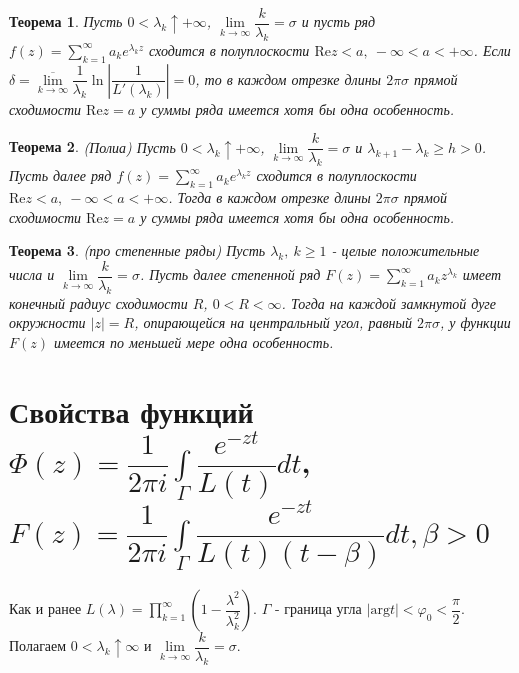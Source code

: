 \documentclass[9pt]{article}
\newtheorem{theorem}{Теорема} %
\begin{document}
				\begin{theorem}
					Пусть  $0 < \lambda_k \uparrow + \infty$,  $\lim\limits_{k\to\infty} \dfrac{k}{\lambda_k} = \sigma$ и пусть ряд $f(z) = \sum\limits_{k=1}^{\infty} a_k e^{\lambda_k z}$ сходится в полуплоскости $\mathrm{Re} z < a, \ -\infty < a < + \infty$. Если $\delta  = \overline{\lim\limits_{k\to\infty}} \dfrac{1}{\lambda_k} \ln{|\dfrac{1}{L'(\lambda_k)}|} = 0$, то в каждом отрезке длины $2\pi \sigma$ прямой сходимости $\mathrm{Re} z = a$ у суммы ряда имеется хотя бы одна особенность.
				\end{theorem}
				\begin{theorem}(Полиа)\newline
					Пусть  $0 < \lambda_k \uparrow + \infty$,  $\lim\limits_{k\to\infty} \dfrac{k}{\lambda_k} = \sigma$ и $\lambda_{k+1} - \lambda_{k} \geq h > 0$. Пусть далее ряд $f(z) = \sum\limits_{k=1}^{\infty} a_k e^{\lambda_k z}$ сходится в полуплоскости $\mathrm{Re} z < a, \ -\infty < a < + \infty$. Тогда в каждом отрезке длины $2\pi \sigma$ прямой сходимости $\mathrm{Re} z = a$ у суммы ряда имеется хотя бы одна особенность.
				\end{theorem}
				\begin{theorem}(про степенные ряды)\newline
					Пусть $\lambda_k, \ k\geq1$ - целые положительные числа и $\lim\limits_{k\to\infty}\dfrac{k}{\lambda_k} = \sigma$. Пусть далее степенной ряд $F(z) = \sum\limits_{k=1}^{\infty} a_k z^{\lambda_k}$  имеет конечный радиус сходимости $R$, $0 < R < \infty$. Тогда на каждой замкнутой дуге окружности $|z| = R$, опирающейся на центральный угол, равный $2\pi \sigma$, у функции $F(z)$ имеется по меньшей мере одна особенность.
					
				\end{theorem}
			\section{Свойства функций $\Phi(z) = \dfrac{1}{2\pi i} \int\limits_{\Gamma} \dfrac{e^{-zt}}{L(t)}dt$, $F(z) = \dfrac{1}{2\pi i} \int\limits_{\Gamma} \dfrac{e^{-zt}}{L(t)(t - \beta)} dt, \beta > 0$ }
			Как и ранее $L(\lambda) = \prod\limits_{k=1}^{\infty} \left(1 - \dfrac{\lambda^2}{\lambda_k^2}\right)$. $\Gamma$ - граница угла $|\mathrm{arg} t| < \varphi_0 < \dfrac\pi2$. Полагаем $ 0 < \lambda_k \uparrow \infty$ и $\lim\limits_{k\to\infty} \dfrac{k}{\lambda_k} = \sigma$.
			
\end{document}
